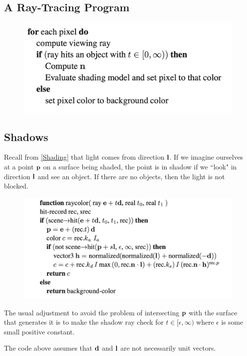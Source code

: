 \documentclass[11pt]{article}
\begin{document}
\subsection{A Ray-Tracing Program}
\begin{figure}[H]
	\centering
	\includegraphics[scale=0.5]{p2}
\end{figure}

\subsection{Shadows}
Recall from \ref{Shading} that light comes from direction $\textbf{l}$. If we imagine ourselves at a point $\textbf{p}$ on a surface being shaded, the point is in shadow if we ``look" in direction $\textbf{l}$ and see an object. If there are no objects, then the light is not blocked.

\begin{figure}[H]
	\centering
	\includegraphics[scale=0.73]{p3}
\end{figure}

\remark
The usual adjustment to avoid the problem of intersecting $\textbf{p}$ with the surface that generates it is to make the shadow ray check for $t \in [\epsilon, \infty)$ where $\epsilon$ is some small positive constant.

\remark
The code above assumes that $\textbf{d}$ and $\textbf{l}$ are not necessarily unit vectors. 
\end{document}
